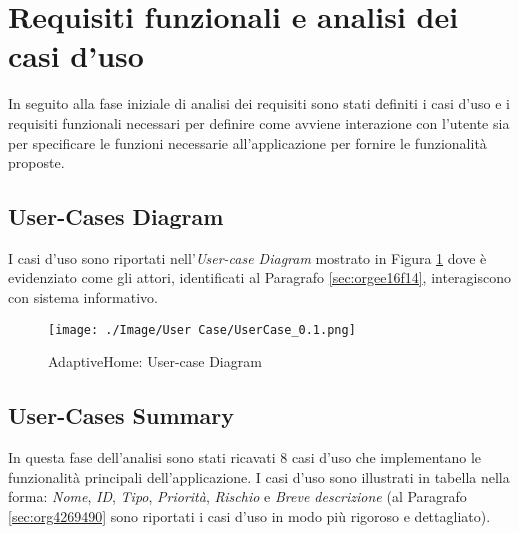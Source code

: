 \documentclass[onecolumn,a4paper]{article}
\begin{document}
\section{Requisiti funzionali e analisi dei casi d’uso}
\label{sec:org5ebe9de}
In seguito alla fase iniziale di analisi dei requisiti sono stati definiti i casi d'uso e i requisiti funzionali necessari per definire come avviene interazione con l'utente sia per specificare le funzioni necessarie all'applicazione per fornire le funzionalità proposte.

\subsection{User-Cases Diagram}
\label{sec:orge071e25}
I casi d'uso sono riportati nell'\emph{User-case Diagram} mostrato in Figura \ref{fig:orgf02a7c2} dove è evidenziato come gli attori, identificati al Paragrafo \ref{sec:orgee16f14}, interagiscono con sistema informativo.

\begin{figure}[htbp]
\centering
\texttt{[image: ./Image/User Case/UserCase\_0.1.png]}
\caption{\label{fig:orgf02a7c2}AdaptiveHome: User-case Diagram}
\end{figure}

\subsection{User-Cases Summary}
\label{sec:org093e1df}
In questa fase dell'analisi sono stati ricavati 8 casi d’uso che implementano le funzionalità principali dell'applicazione. I casi d'uso sono illustrati in tabella nella forma: \emph{Nome}, \emph{ID}, \emph{Tipo}, \emph{Priorità}, \emph{Rischio} e \emph{Breve descrizione} (al Paragrafo \ref{sec:org4269490} sono riportati i casi d'uso in modo più rigoroso e dettagliato). 
\end{document}
